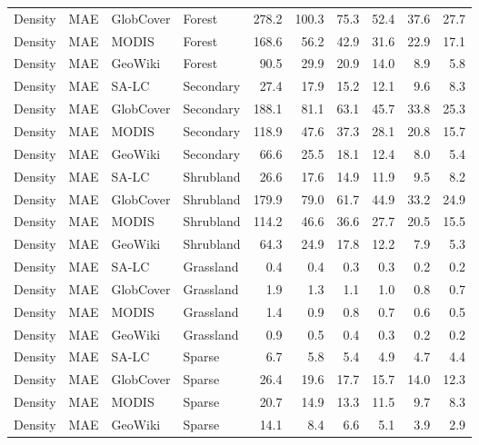 \begin{longtable}{llllrrrrrr}
  Density & MAE & GlobCover & Forest & 278.2 & 100.3 & 75.3 & 52.4 & 37.6 & 27.7 \\ 
  Density & MAE & MODIS & Forest & 168.6 & 56.2 & 42.9 & 31.6 & 22.9 & 17.1 \\ 
  Density & MAE & GeoWiki & Forest & 90.5 & 29.9 & 20.9 & 14.0 & 8.9 & 5.8 \\ 
  Density & MAE & SA-LC & Secondary & 27.4 & 17.9 & 15.2 & 12.1 & 9.6 & 8.3 \\ 
  Density & MAE & GlobCover & Secondary & 188.1 & 81.1 & 63.1 & 45.7 & 33.8 & 25.3 \\ 
  Density & MAE & MODIS & Secondary & 118.9 & 47.6 & 37.3 & 28.1 & 20.8 & 15.7 \\ 
  Density & MAE & GeoWiki & Secondary & 66.6 & 25.5 & 18.1 & 12.4 & 8.0 & 5.4 \\ 
  Density & MAE & SA-LC & Shrubland & 26.6 & 17.6 & 14.9 & 11.9 & 9.5 & 8.2 \\ 
  Density & MAE & GlobCover & Shrubland & 179.9 & 79.0 & 61.7 & 44.9 & 33.2 & 24.9 \\ 
  Density & MAE & MODIS & Shrubland & 114.2 & 46.6 & 36.6 & 27.7 & 20.5 & 15.5 \\ 
  Density & MAE & GeoWiki & Shrubland & 64.3 & 24.9 & 17.8 & 12.2 & 7.9 & 5.3 \\ 
  Density & MAE & SA-LC & Grassland & 0.4 & 0.4 & 0.3 & 0.3 & 0.2 & 0.2 \\ 
  Density & MAE & GlobCover & Grassland & 1.9 & 1.3 & 1.1 & 1.0 & 0.8 & 0.7 \\ 
  Density & MAE & MODIS & Grassland & 1.4 & 0.9 & 0.8 & 0.7 & 0.6 & 0.5 \\ 
  Density & MAE & GeoWiki & Grassland & 0.9 & 0.5 & 0.4 & 0.3 & 0.2 & 0.2 \\ 
  Density & MAE & SA-LC & Sparse & 6.7 & 5.8 & 5.4 & 4.9 & 4.7 & 4.4 \\ 
  Density & MAE & GlobCover & Sparse & 26.4 & 19.6 & 17.7 & 15.7 & 14.0 & 12.3 \\ 
  Density & MAE & MODIS & Sparse & 20.7 & 14.9 & 13.3 & 11.5 & 9.7 & 8.3 \\ 
  Density & MAE & GeoWiki & Sparse & 14.1 & 8.4 & 6.6 & 5.1 & 3.9 & 2.9 \\ 
   \hline
\hline
\end{longtable}

